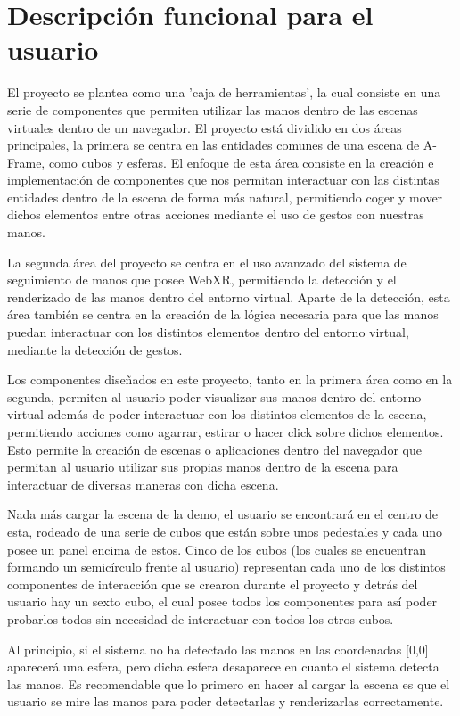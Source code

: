 \documentclass[a4paper, 12pt]{book}
\begin{document}
\section{Descripción funcional para el usuario}
\label{sec:manual-usuario}
El proyecto se plantea como una 'caja de herramientas', la cual consiste en una serie de componentes que permiten utilizar las manos dentro de las escenas virtuales dentro de un navegador. El proyecto está dividido en dos áreas principales, la primera se centra en las entidades comunes de una escena de A-Frame, como cubos y esferas. El enfoque de esta área consiste en la creación e implementación de componentes que nos permitan interactuar con las distintas entidades dentro de la escena de forma más natural, permitiendo coger y mover dichos elementos entre otras acciones mediante el uso de gestos con nuestras manos.

La segunda área del proyecto se centra en el uso avanzado del sistema de seguimiento de manos que posee WebXR, permitiendo la detección y el renderizado de las manos dentro del entorno virtual. Aparte de la detección, esta área también se centra en la creación de la lógica necesaria para que las manos puedan interactuar con los distintos elementos dentro del entorno virtual, mediante la detección de gestos.

Los componentes diseñados en este proyecto, tanto en la primera área como en la segunda, permiten al usuario poder visualizar sus manos dentro del entorno virtual además de poder interactuar con los distintos elementos de la escena, permitiendo acciones como agarrar, estirar o hacer click sobre dichos elementos. Esto permite la creación de escenas o aplicaciones dentro del navegador que permitan al usuario utilizar sus propias manos dentro de la escena para interactuar de diversas maneras con dicha escena. 

Nada más cargar la escena de la demo, el usuario se encontrará en el centro de esta, rodeado de una serie de cubos que están sobre unos pedestales y cada uno posee un panel encima de estos. Cinco de los cubos (los cuales se encuentran formando un semicírculo frente al usuario) representan cada uno de los distintos componentes de interacción que se crearon durante el proyecto y detrás del usuario hay un sexto cubo, el cual posee todos los componentes para así poder probarlos todos sin necesidad de interactuar con todos los otros cubos.

Al principio, si el sistema no ha detectado las manos en las coordenadas [0,0] aparecerá una esfera, pero dicha esfera desaparece en cuanto el sistema detecta las manos. Es recomendable que lo primero en hacer al cargar la escena es que el usuario se mire las manos para poder detectarlas y renderizarlas correctamente. 
\end{document}
